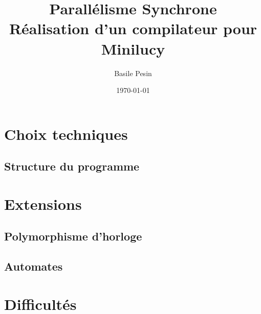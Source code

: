 \documentclass{article}
\title{Parallélisme Synchrone\\ Réalisation d'un compilateur pour Minilucy}
\author{Basile Pesin}
\date{\today}
\begin{document}
\maketitle

\section{Choix techniques}

\subsection{Structure du programme}

\cite{Biernacki08}

\section{Extensions}

\subsection{Polymorphisme d'horloge}

\subsection{Automates}

\cite{Colaco05}

\section{Difficultés}

{}

\end{document}
